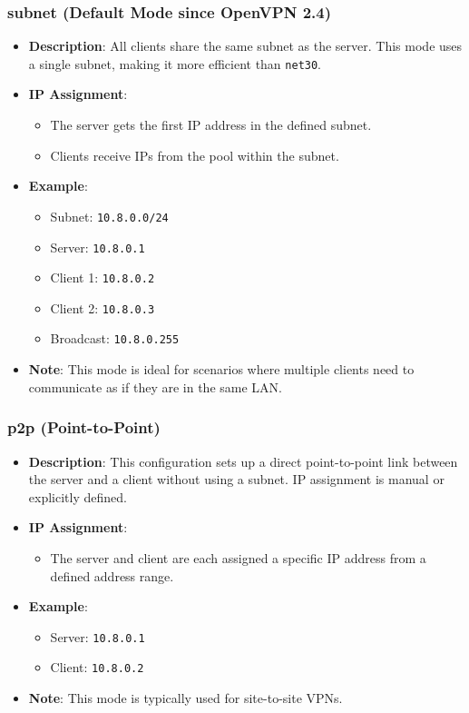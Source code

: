 \subsubsection{subnet (Default Mode since OpenVPN 2.4)}
\begin{itemize}
    \item \textbf{Description}: All clients share the same subnet as the server. This mode uses a single subnet, making it more efficient than \texttt{net30}.
    \item \textbf{IP Assignment}:
    \begin{itemize}
        \item The server gets the first IP address in the defined subnet.
        \item Clients receive IPs from the pool within the subnet.
    \end{itemize}
    \item \textbf{Example}:
    \begin{itemize}
        \item Subnet: \texttt{10.8.0.0/24}
        \item Server: \texttt{10.8.0.1}
        \item Client 1: \texttt{10.8.0.2}
        \item Client 2: \texttt{10.8.0.3}
        \item Broadcast: \texttt{10.8.0.255}
    \end{itemize}
    \item \textbf{Note}: This mode is ideal for scenarios where multiple clients need to communicate as if they are in the same LAN.
\end{itemize}

\subsubsection{p2p (Point-to-Point)}
\begin{itemize}
    \item \textbf{Description}: This configuration sets up a direct point-to-point link between the server and a client without using a subnet. IP assignment is manual or explicitly defined.
    \item \textbf{IP Assignment}:
    \begin{itemize}
        \item The server and client are each assigned a specific IP address from a defined address range.
    \end{itemize}
    \item \textbf{Example}:
    \begin{itemize}
        \item Server: \texttt{10.8.0.1}
        \item Client: \texttt{10.8.0.2}
    \end{itemize}
    \item \textbf{Note}: This mode is typically used for site-to-site VPNs.
\end{itemize}

